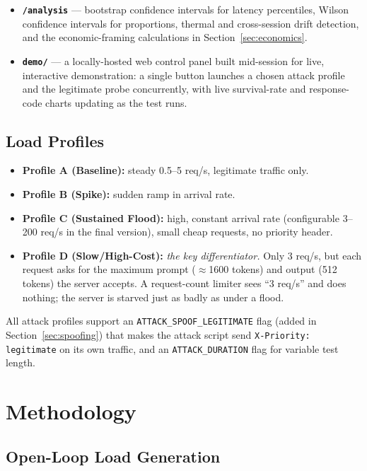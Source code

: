 \documentclass[11pt]{article}
\begin{document}
\begin{itemize}
    common per-request CSV schema via a custom normalizer
    (\texttt{loadgen/normalize\_csv.py}).
    \item \textbf{\texttt{/analysis}} --- bootstrap confidence intervals for
    latency percentiles, Wilson confidence intervals for proportions, thermal
    and cross-session drift detection, and the economic-framing calculations
    in Section~\ref{sec:economics}.
    \item \textbf{\texttt{demo/}} --- a locally-hosted web control panel built
    mid-session for live, interactive demonstration: a single button launches
    a chosen attack profile and the legitimate probe concurrently, with live
    survival-rate and response-code charts updating as the test runs.
\end{itemize}

\subsection{Load Profiles}
\label{sec:profiles}

\begin{itemize}
    \item \textbf{Profile A (Baseline):} steady 0.5--5 req/s, legitimate
    traffic only.
    \item \textbf{Profile B (Spike):} sudden ramp in arrival rate.
    \item \textbf{Profile C (Sustained Flood):} high, constant arrival rate
    (configurable 3--200 req/s in the final version), small cheap requests, no
    priority header.
    \item \textbf{Profile D (Slow/High-Cost):} \emph{the key differentiator.}
    Only 3 req/s, but each request asks for the maximum prompt
    ($\approx$1600 tokens) and output (512 tokens) the server accepts. A
    request-count limiter sees ``3 req/s'' and does nothing; the server is
    starved just as badly as under a flood.
\end{itemize}

All attack profiles support an \texttt{ATTACK\_SPOOF\_LEGITIMATE} flag (added
in Section~\ref{sec:spoofing}) that makes the attack script send
\texttt{X-Priority: legitimate} on its own traffic, and an
\texttt{ATTACK\_DURATION} flag for variable test length.

\section{Methodology}

\subsection{Open-Loop Load Generation}
\end{document}
